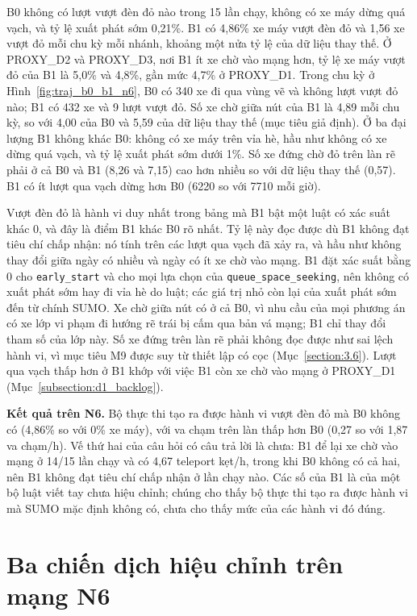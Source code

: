 \documentclass[../main.tex]{subfiles}
\begin{document}
B0 không có lượt vượt đèn đỏ nào trong 15 lần chạy, không có xe máy dừng quá vạch, và tỷ lệ xuất phát sớm 0,21\%. B1 có 4,86\% xe máy vượt đèn đỏ và 1,56 xe vượt đỏ mỗi chu kỳ mỗi nhánh, khoảng một nửa tỷ lệ của dữ liệu thay thế. Ở PROXY\_D2 và PROXY\_D3, nơi B1 ít xe chờ vào mạng hơn, tỷ lệ xe máy vượt đỏ của B1 là 5,0\% và 4,8\%, gần mức 4,7\% ở PROXY\_D1. Trong chu kỳ ở Hình~\ref{fig:traj_b0_b1_n6}, B0 có 340 xe đi qua vùng vẽ và không lượt vượt đỏ nào; B1 có 432 xe và 9 lượt vượt đỏ. Số xe chờ giữa nút của B1 là 4,89 mỗi chu kỳ, so với 4,00 của B0 và 5,59 của dữ liệu thay thế (mục tiêu giả định). Ở ba đại lượng B1 không khác B0: không có xe máy trên vỉa hè, hầu như không có xe dừng quá vạch, và tỷ lệ xuất phát sớm dưới 1\%. Số xe đứng chờ đỏ trên làn rẽ phải ở cả B0 và B1 (8,26 và 7,15) cao hơn nhiều so với dữ liệu thay thế (0,57). B1 có ít lượt qua vạch dừng hơn B0 (6220 so với 7710 mỗi giờ).

Vượt đèn đỏ là hành vi duy nhất trong bảng mà B1 bật một luật có xác suất khác 0, và đây là điểm B1 khác B0 rõ nhất. Tỷ lệ này đọc được dù B1 không đạt tiêu chí chấp nhận: nó tính trên các lượt qua vạch đã xảy ra, và hầu như không thay đổi giữa ngày có nhiều và ngày có ít xe chờ vào mạng. B1 đặt xác suất bằng 0 cho \texttt{early\_start} và cho mọi lựa chọn của \texttt{queue\_space\_seeking}, nên không có xuất phát sớm hay đi vỉa hè do luật; các giá trị nhỏ còn lại của xuất phát sớm đến từ chính SUMO. Xe chờ giữa nút có ở cả B0, vì nhu cầu của mọi phương án có xe lớp vi phạm đi hướng rẽ trái bị cấm qua bản vá mạng; B1 chỉ thay đổi tham số của lớp này. Số xe đứng trên làn rẽ phải không đọc được như sai lệch hành vi, vì mục tiêu M9 được suy từ thiết lập có cọc (Mục~\ref{section:3.6}). Lượt qua vạch thấp hơn ở B1 khớp với việc B1 còn xe chờ vào mạng ở PROXY\_D1 (Mục~\ref{subsection:d1_backlog}).

\textbf{Kết quả trên N6.} Bộ thực thi tạo ra được hành vi vượt đèn đỏ mà B0 không có (4,86\% so với 0\% xe máy), với va chạm trên làn thấp hơn B0 (0,27 so với 1,87 va chạm/h). Vế thứ hai của câu hỏi có câu trả lời là chưa: B1 để lại xe chờ vào mạng ở 14/15 lần chạy và có 4,67 teleport kẹt/h, trong khi B0 không có cả hai, nên B1 không đạt tiêu chí chấp nhận ở lần chạy nào. Các số của B1 là của một bộ luật viết tay chưa hiệu chỉnh; chúng cho thấy bộ thực thi tạo ra được hành vi mà SUMO mặc định không có, chưa cho thấy mức của các hành vi đó đúng.

\section{Ba chiến dịch hiệu chỉnh trên mạng N6}
\label{subsection:campaigns_n6}
\end{document}
